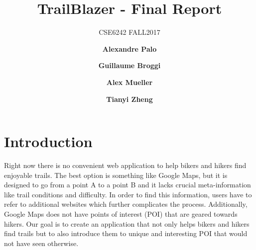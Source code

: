 \documentclass[sigconf]{acmart}
\begin{document}
\title{TrailBlazer - Final Report}
\subtitle{CSE6242 FALL2017}


\author{\textbf{Alexandre Palo}}

\author{\textbf{Guillaume Broggi}}

\author{\textbf{Alex Mueller}}

\author{\textbf{Tianyi Zheng}}

\maketitle

\section{Introduction}

Right now there is no convenient web application to help bikers and hikers find enjoyable trails. The best option is something like Google Maps, but it is designed to go from a point A to a point B and it lacks crucial meta-information like trail conditions and difficulty. In order to find this information, users have to refer to additional websites which further complicates the process. Additionally, Google Maps does not have points of interest (POI) that are geared towards hikers. Our goal is to create an application that not only helps bikers and hikers find trails but to also introduce them to unique and interesting POI that would not have seen otherwise.
\end{document}
